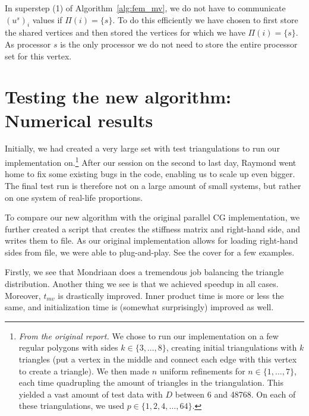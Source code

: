 \documentclass[11pt]{amsart}
\theoremstyle{definition}
\begin{document}
In superstep (1) of Algorithm~\ref{alg:fem_mv}, we do not have to communicate $(u^s)_i$ values if $\Pi(i) = \{s\}$. To do this efficiently we have chosen to first store the shared vertices and then stored the vertices for which we have $\Pi(i)=\{s\}$. As processor $s$ is the only processor we do not need to store the entire processor set for this vertex.

\section{Testing the new algorithm: Numerical results}
Initially, we had created a very large set with test triangulations to run our implementation on.\footnote{\emph{From the original report.} We chose to run our implementation on a few regular polygons with sides $k \in \{3, \ldots, 8\}$, creating initial triangulations with $k$ triangles (put a vertex in the middle and connect each edge with this vertex to create a triangle). We then made $n$ uniform refinements for $n \in \{1, \ldots, 7\}$, each time quadrupling the amount of triangles in the triangulation. This yielded a vast amount of test data with $D$ between 6 and 48768. On each of these triangulations, we used $p \in \{1, 2, 4, \ldots, 64\}$.} After our session on the second to last day, Raymond went home to fix some existing bugs in the code, enabling us to scale up even bigger. The final test run is therefore not on a large amount of small systems, but rather on one system of real-life proportions.

To compare our new algorithm with the original parallel CG implementation, we further created a script that creates the stiffness matrix and right-hand side, and writes them to file. As our original implementation allows for loading right-hand sides from file, we were able to plug-and-play. See the cover for a few examples.

Firstly, we see that Mondriaan does a tremendous job balancing the triangle distribution. Another thing we see is that we achieved speedup in all cases. Moreover, $t_{mv}$ is drastically improved. Inner product time is more or less the same, and initialization time is (somewhat surprisingly) improved as well.
\end{document}
